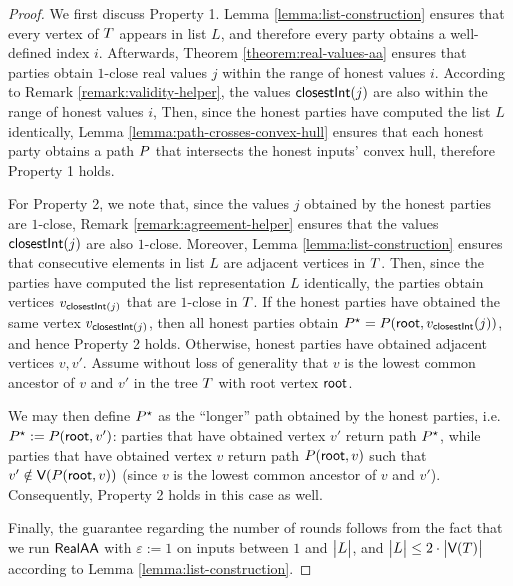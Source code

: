 \begin{proof}
We first discuss Property 1.
Lemma \ref{lemma:list-construction} ensures that every vertex of $T$ appears in list $L$, and therefore every party obtains a well-defined index $i$.
Afterwards, Theorem \ref{theorem:real-values-aa} ensures that parties obtain $1$-close real values $j$ within the range of honest values $i$. According to Remark \ref{remark:validity-helper}, the values $\textsf{closestInt}(j)$ are also within the range of honest values $i$,
Then, since the honest parties have computed the list $L$ identically, Lemma \ref{lemma:path-crosses-convex-hull} ensures that each honest party obtains a path $P$ that intersects the honest inputs' convex hull, therefore Property 1 holds.


For Property 2, we note that, since the values $j$ obtained by the honest parties are $1$-close, Remark \ref{remark:agreement-helper} ensures that the values $\textsf{closestInt}(j)$ are also $1$-close. Moreover, Lemma \ref{lemma:list-construction} ensures that consecutive elements in list $L$ are adjacent vertices in $T$. Then, since the parties have computed the list representation $L$ identically, the parties obtain vertices $v_{\textsf{closestInt}(j)}$ that are $1$-close in $T$.
If the honest parties have obtained the same vertex $v_{\textsf{closestInt}(j)}$, then all honest parties obtain $P^{\star} = P(\textsf{root}, v_{\textsf{closestInt}}(j))$, and hence Property 2 holds. Otherwise, honest parties have obtained adjacent vertices $v, v'$. Assume without loss of generality that $v$ is the lowest common ancestor of $v$ and $v'$ in the tree $T$ with root vertex $\textsf{root}$. 

We may then define $P^\star$ as the ``longer'' path obtained by the honest parties, i.e. $P^\star := P(\textsf{root}, v')$: parties that have obtained vertex $v'$ return path $P^\star$, while parties that have obtained vertex $v$ return path $P(\textsf{root}, v)$ such that $v' \notin \textsf{V}(P(\textsf{root}, v))$ (since $v$ is the lowest common ancestor of $v$ and $v'$). Consequently, Property 2 holds in this case as well.

Finally, the guarantee regarding the number of rounds follows from the fact that we run $\textsf{RealAA}$ with $\varepsilon := 1$ on inputs between $1$ and $\big\lvert L\big\rvert$, and $\big\lvert L\big\rvert \leq 2 \cdot \big\lvert\textsf{V}(T)\big\rvert$ according to Lemma \ref{lemma:list-construction}. 
\end{proof}

